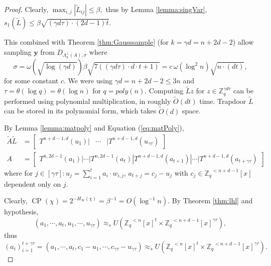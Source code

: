 \documentclass[11pt]{article}
\newcommand{\poly}[2]{{#1}^{<#2}[x]}
\newcommand{\Z}{\mathbb{Z}}
\newcommand{\abs}[1]{|#1 |}
\DeclareMathOperator{\cp}{CP}
\begin{document}
\begin{proof}
    
     
     
     Clearly, $\max_{i,j} \abs{\tilde{L}_{ij}} \leq \beta,$ thus by Lemma \ref{lemma:singVar}, $s_1(\tilde{L}) \leq  \beta\sqrt{( \gamma d \tau) \cdot (2d-1) t}.$
     
     This combined with Theorem \ref{thm:Gausssample} (for $k = \gamma d = n+2d-2$) allow sampling $\textbf{y}$ from $D_{\Lambda^{\perp}_u(A), \sigma }$ where $$\sigma =   \omega (\sqrt{\log (\gamma d)}) \beta \sqrt{7((\gamma d\tau)\cdot d \cdot t + 1)} = c \, \omega (\log^2 n) \sqrt{n \cdot (dt)},$$
     for some constant $c.$ We were using $\gamma d = n+2 d-2 \leq 3n$ and  $\tau = \theta(\log q) = \theta(\log n)$ for $q =poly(n).$ Computing $\tilde{L} z$ for $z \in \Z_q^{\gamma d \tau}$ can be performed using polynomial multiplication, in roughly $\tilde{O}(dt)$ time. Trapdoor $\tilde{L}$ can be stored in its polynomial form, which takes $\tilde{O}(d)$ space.
     
      By Lemma \ref{lemma:matpoly} and Equation (\ref{eq:matPoly}), 
      \begin{equation} \label{eq:A}
      \begin{split}
         \tilde{A} \tilde{L} &= \begin{bmatrix} T^{n+d-1,d}(u_1)| & \cdots &  |T^{n+d-1,d}(u_{\gamma \tau}) \end{bmatrix} \\
         A &= \begin{bmatrix} T^{n,2d-1}(a_1) | \cdots | T^{n,2d-1} (a_t)| T^{n+d-1,d}(a_{t+1}) | \cdots |T^{n+d-1,d}(a_{t+\gamma\tau}) \end{bmatrix}
      \end{split}
      \end{equation}
     where for $j\in [\gamma \tau]: u_j = \sum_{i=1}^t a_i \cdot w_{i,j}, \, a_{t+j} =c_j - u_j $  with $c_j \in \poly{\Z_q}{n+d-1}$ dependent only on $j.$ 
     
     Clearly, $\cp(\chi) = 2^{-H_{\infty}(\chi)}  = \beta^{-1} = O(\log^{-1} n).$ By Theorem \ref{thm:lhl} and hypothesis,
     $$(a_1, \cdots, a_t, u_1, \cdots, u_{\gamma \tau}) \approx_s U(\poly{\Z_q}{n}^t \times  \poly{\Z_q}{n+d-1}^{\gamma \tau}),$$
     thus $(a_i)_{i=1}^{t+\gamma\tau} =(a_1, \cdots, a_t, c_1-u_1, \cdots, c_{\gamma \tau} -u_{\gamma \tau}) \approx_s U(\poly{\Z_q}{n}^t \times  \poly{\Z_q}{n+d-1}^{\gamma \tau}).$
     

\end{proof}
\end{document}
